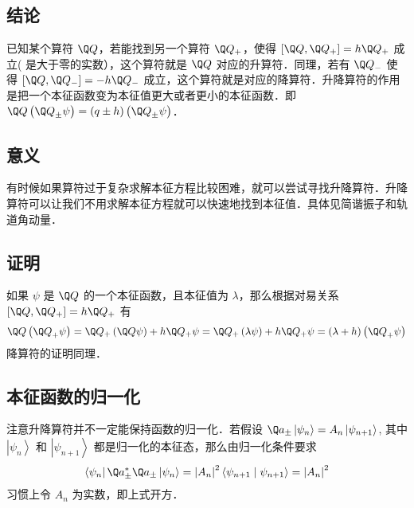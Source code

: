

\subsection{结论}

已知某个算符 $\Q Q$，若能找到另一个算符 ${\Q Q_ + }$，使得 $[\Q Q,{\Q Q_ + }] = h{\Q Q_ + }$ 成立( 是大于零的实数），这个算符就是 $\Q Q$ 对应的升算符．同理，若有 ${\Q Q_- }$ 使得 $[\Q Q,{\Q Q_ - }] =  - h{\Q Q_ - }$ 成立，这个算符就是对应的降算符．升降算符的作用是把一个本征函数变为本征值更大或者更小的本征函数．即 $\Q Q\left( {{{\Q Q}_ \pm }\psi } \right) = \left( {q \pm h} \right)\left( {{{\Q Q}_ \pm }\psi } \right)$．

\subsection{意义}
有时候如果算符过于复杂求解本征方程比较困难，就可以尝试寻找升降算符．升降算符可以让我们不用求解本征方程就可以快速地找到本征值．具体见简谐振子和轨道角动量．%

\subsection{证明}
如果 $\psi$ 是 $\Q Q$ 的一个本征函数，且本征值为 $\lambda$，那么根据对易关系 $[\Q Q,{\Q Q_ + }] = h{\Q Q_ + }$ 有
\begin{equation}
\Q Q\left( {{{\Q Q}_ + }\psi } \right) = {\Q Q_ + }\left( {\Q Q\psi } \right) + h{\Q Q_ + }\psi  = {\Q Q_ + }\left( {\lambda \psi } \right) + h{\Q Q_ + }\psi  = \left( {\lambda  + h} \right)\left( {{{\Q Q}_ + }\psi } \right)
\end{equation}
降算符的证明同理．

\subsection{本征函数的归一化}
注意升降算符并不一定能保持函数的归一化．若假设 ${\Q a_ \pm }\left| {{\psi _n}} \right\rangle  = {A_n}\left| {{\psi _{n + 1}}} \right\rangle$, 其中 $\left| {{\psi _n}} \right\rangle$ 和 $\left| {{\psi _{n + 1}}} \right\rangle$ 都是归一化的本征态，那么由归一化条件要求
\begin{equation}
\left\langle {{\psi _n}} \right|\Q a_ \pm ^ * {\Q a_ \pm }\left| {{\psi _n}} \right\rangle  = {\left| {{A_n}} \right|^2}\left\langle {{{\psi _{n + 1}}}}
 \mathrel{\left | {\vphantom {{{\psi _{n + 1}}} {{\psi _{n + 1}}}}}
 \right. \kern-\nulldelimiterspace}
 {{{\psi _{n + 1}}}} \right\rangle  = {\left| {{A_n}} \right|^2}
\end{equation}
习惯上令 $A_n$ 为实数，即上式开方． 
